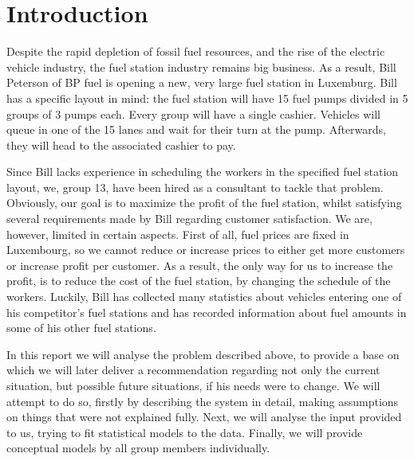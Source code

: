 \section{Introduction}
Despite the rapid depletion of fossil fuel resources, and the rise of the electric vehicle industry, the fuel station industry remains big business.
As a result, Bill Peterson of BP fuel is opening a new, very large fuel station in Luxemburg.
Bill has a specific layout in mind: the fuel station will have 15 fuel pumps divided in 5 groups of 3 pumps each.
Every group will have a single cashier.
Vehicles will queue in one of the 15 lanes and wait for their turn at the pump.
Afterwards, they will head to the associated cashier to pay.

Since Bill lacks experience in scheduling the workers in the specified fuel station layout, we, group 13, have been hired as a consultant to tackle that problem.
Obviously, our goal is to maximize the profit of the fuel station, whilst satisfying several requirements made by Bill regarding customer satisfaction.
We are, however, limited in certain aspects.
First of all, fuel prices are fixed in Luxembourg, so we cannot reduce or increase prices to either get more customers or increase profit per customer.
As a result, the only way for us to increase the profit, is to reduce the cost of the fuel station, by changing the schedule of the workers.
Luckily, Bill has collected many statistics about vehicles entering one of his competitor's fuel stations and has recorded information about fuel amounts in some of his other fuel stations.

In this report we will analyse the problem described above, to provide a base on which we will later deliver a recommendation regarding not only the current situation, but possible future situations, if his needs were to change.
We will attempt to do so, firstly by describing the system in detail, making assumptions on things that were not explained fully.
Next, we will analyse the input provided to us, trying to fit statistical models to the data.
Finally, we will provide conceptual models by all group members individually.